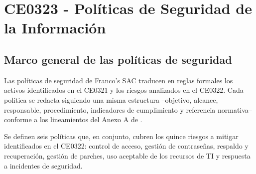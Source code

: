 \documentclass[11pt, a4paper, oneside]{report}
\begin{document}
\chapter{CE0323 - Políticas de Seguridad de la Información}

\section{Marco general de las políticas de seguridad}

Las políticas de seguridad de Franco's SAC traducen en reglas formales los activos identificados en el CE0321 y los riesgos analizados en el CE0322. Cada política se redacta siguiendo una misma estructura --objetivo, alcance, responsable, procedimiento, indicadores de cumplimiento y referencia normativa-- conforme a los lineamientos del Anexo A de \citet{iso27001}.

Se definen seis políticas que, en conjunto, cubren los quince riesgos a mitigar identificados en el CE0322: control de acceso, gestión de contraseñas, respaldo y recuperación, gestión de parches, uso aceptable de los recursos de TI y respuesta a incidentes de seguridad.

\renewcommand{\arraystretch}{1.3}
\footnotesize
{}
\end{document}
